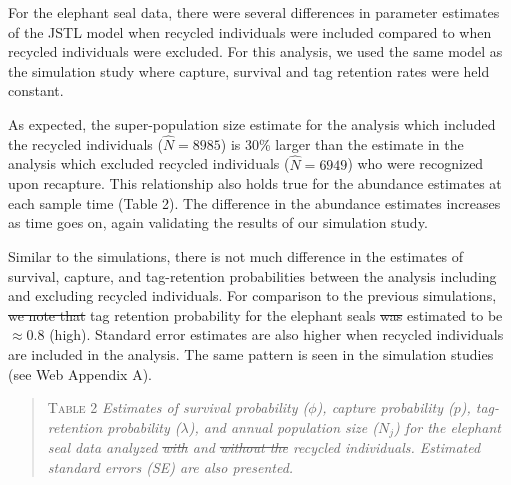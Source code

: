 \documentclass[12pt]{article}
\providecommand{\DIFaddtex}[1]{{\protect\color{blue}\uwave{#1}}} %
\providecommand{\DIFdeltex}[1]{{\protect\color{red}\sout{#1}}}                      %
\providecommand{\DIFaddbegin}{} %
\providecommand{\DIFaddend}{} %
\providecommand{\DIFdelbegin}{} %
\providecommand{\DIFdelend}{} %
\providecommand{\DIFadd}[1]{\texorpdfstring{\DIFaddtex{#1}}{#1}} %
\providecommand{\DIFdel}[1]{\texorpdfstring{\DIFdeltex{#1}}{}} %
\newcommand{\DIFscaledelfig}{0.5}
\newlength{\DIFdelgraphicswidth} %
\newlength{\DIFdelgraphicsheight} %
\newcommand{\DIFaddincludegraphics}[2][]{{\color{blue}\fbox{\DIFOincludegraphics[#1]{#2}}}} %
\newcommand{\DIFdelincludegraphics}[2][]{%
\sbox{\DIFdelgraphicsbox}{\DIFOincludegraphics[#1]{#2}}%
\settoboxwidth{\DIFdelgraphicswidth}{\DIFdelgraphicsbox} %
\settoboxtotalheight{\DIFdelgraphicsheight}{\DIFdelgraphicsbox} %
\scalebox{\DIFscaledelfig}{%
\parbox[b]{\DIFdelgraphicswidth}{\usebox{\DIFdelgraphicsbox}\\[-\baselineskip] \rule{\DIFdelgraphicswidth}{0em}}\llap{\resizebox{\DIFdelgraphicswidth}{\DIFdelgraphicsheight}{%
\setlength{\unitlength}{\DIFdelgraphicswidth}%
\begin{picture}(1,1)%
\thicklines\linethickness{2pt} %
{\color[rgb]{1,0,0}\put(0,0){\framebox(1,1){}}}%
{\color[rgb]{1,0,0}\put(0,0){\line( 1,1){1}}}%
{\color[rgb]{1,0,0}\put(0,1){\line(1,-1){1}}}%
\end{picture}%
}\hspace*{3pt}}} %
} %
\DeclareRobustCommand{\DIFaddbegin}{\DIFOaddbegin \let\includegraphics\DIFaddincludegraphics} %
\DeclareRobustCommand{\DIFaddend}{\DIFOaddend \let\includegraphics\DIFOincludegraphics} %
\DeclareRobustCommand{\DIFdelbegin}{\DIFOdelbegin \let\includegraphics\DIFdelincludegraphics} %
\DeclareRobustCommand{\DIFdelend}{\DIFOaddend \let\includegraphics\DIFOincludegraphics} %
\begin{document}
For the elephant seal data, there were several differences in parameter
estimates of the JSTL model when recycled individuals were included
compared to when recycled individuals were excluded. For this analysis, we used the same model as the simulation study where capture, survival and tag retention rates were held constant.  

As expected, the
super-population size estimate for the analysis which included the
recycled individuals ($\hat{N}=8985$) is 30\% larger than the estimate in the analysis
which excluded recycled individuals ($\hat{N}=6949$) who were recognized upon recapture. This relationship also holds true for the abundance estimates
at each sample time (Table 2). The difference in the abundance estimates increases
 as time goes on, again validating the results of our
simulation study.

Similar to the simulations, there is not much difference in the
estimates of survival, capture, and tag-retention probabilities between the analysis
including and excluding recycled individuals. For comparison to the previous
simulations, \DIFdelbegin \DIFdel{we note that }\DIFdelend \DIFaddbegin \DIFadd{the }\DIFaddend tag retention probability for the
elephant seals \DIFdelbegin \DIFdel{was }\DIFdelend \DIFaddbegin \DIFadd{is }\DIFaddend estimated to be $\approx 0.8$ (high).  Standard error estimates are also higher when recycled individuals are included in the analysis. The same pattern is seen in the simulation studies (see Web Appendix A).

\begin{quote}
\textsc{Table 2}
\textsl{Estimates of survival probability ($\phi$), capture probability ($p$), tag-retention probability ($\lambda$), and annual population size ($N_j$) for the elephant seal data analyzed \DIFdelbegin \DIFdel{with }\DIFdelend \DIFaddbegin \DIFadd{including }\DIFaddend and \DIFdelbegin \DIFdel{without the }\DIFdelend \DIFaddbegin \DIFadd{excluding }\DIFaddend recycled individuals. Estimated standard errors (SE) are also presented.}
\end{quote}
\end{document}
